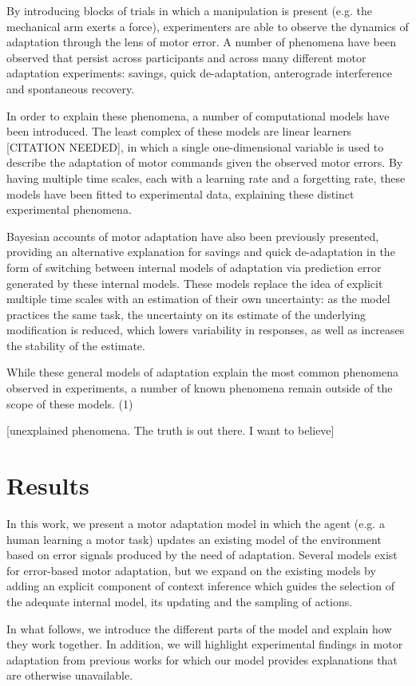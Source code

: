 \documentclass[a4paper,doc,floatsintext,natbib]{apa6}
\begin{document}
By introducing blocks of trials in which a manipulation is present (e.g. the mechanical arm exerts a force), experimenters are able to observe the dynamics of adaptation through the lens of motor error. A number of phenomena have been observed that persist across participants and across many different motor adaptation experiments: savings, quick de-adaptation, anterograde interference and spontaneous recovery.

In order to explain these phenomena, a number of computational models have been introduced. The least complex of these models are linear learners [CITATION NEEDED], in which a single one-dimensional variable is used to describe the adaptation of motor commands given the observed motor errors. By having multiple time scales, each with a learning rate and a forgetting rate, these models have been fitted to experimental data, explaining these distinct experimental phenomena.

Bayesian accounts of motor adaptation have also been previously presented, providing an alternative explanation for savings and quick de-adaptation in the form of switching between internal models of adaptation via prediction error generated by these internal models. These models replace the idea of explicit multiple time scales with an estimation of their own uncertainty: as the model practices the same task, the uncertainty on its estimate of the underlying modification is reduced, which lowers variability in responses, as well as increases the stability of the estimate.

While these general models of adaptation explain the most common phenomena observed in experiments, a number of known phenomena remain outside of the scope of these models. (1)

[unexplained phenomena. The truth is out there. I want to believe]

\section{Results}
In this work, we present a motor adaptation model in which the agent (e.g. a human learning a motor task) updates an existing model of the environment based on error signals produced by the need of adaptation. Several models exist for error-based motor adaptation, but we expand on the existing models by adding an explicit component of context inference which guides the selection of the adequate internal model, its updating and the sampling of actions.

In what follows, we introduce the different parts of the model and explain how they work together. In addition, we will highlight experimental findings in motor adaptation from previous works for which our model provides explanations that are otherwise unavailable.
\end{document}
